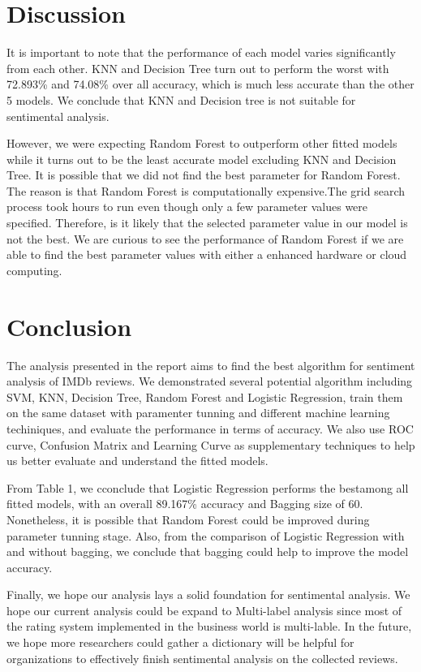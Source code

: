 \documentclass[10pt,twocolumn]{article}
\begin{document}
	\section{Discussion}
	It is important to note that the performance of each model varies significantly from each other. KNN and Decision Tree turn out to perform the worst with 72.893\% and 74.08\% over all accuracy, which is much less accurate than the other 5 models. We conclude that KNN and Decision tree is not suitable for sentimental analysis. 
	
	However, we were expecting Random Forest to outperform other fitted models while it turns out to be the least accurate model excluding KNN and Decision Tree. It is possible that we did not find the best parameter for Random Forest. The reason is that Random Forest is computationally expensive.The grid search process took hours to run even though only a few parameter values were specified. Therefore, is it likely that the selected parameter value in our model is not the best. We are curious to see the performance of Random Forest if we are able to find the best parameter values with either a enhanced hardware or cloud computing.
	
	\section{Conclusion}
	The analysis presented in the report aims to find the best algorithm for sentiment analysis of IMDb reviews. We demonstrated several potential algorithm including SVM, KNN, Decision Tree, Random Forest and Logistic Regression, train them on the same dataset with paramenter tunning and different machine learning techiniques, and evaluate the performance in terms of accuracy. We also use ROC curve, Confusion Matrix and Learning Curve as supplementary techniques to help us better evaluate and understand the fitted models.
	
	From Table 1, we cconclude that Logistic Regression performs the bestamong all fitted models, with an overall 89.167\% accuracy and Bagging size of 60. Nonetheless, it is possible that Random Forest could be improved during parameter tunning stage. Also, from the comparison of Logistic Regression with and without bagging, we conclude that bagging could help to improve the model accuracy.
	
	Finally, we hope our analysis lays a solid foundation for sentimental analysis. We hope our current analysis could be expand to Multi-label analysis since most of the rating system implemented in the business world is multi-lable. In the future, we hope more researchers could gather a dictionary will be helpful for organizations to effectively finish sentimental analysis on the collected reviews.
	
\end{document}
